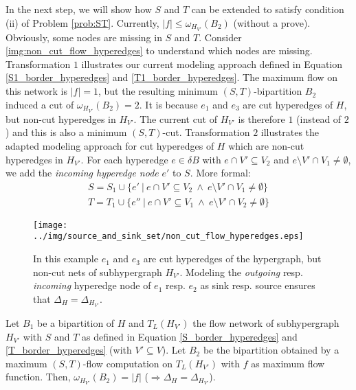 In the next step, we will show how $S$ and $T$ can be extended to satisfy condition (ii)
of Problem \autoref{prob:ST}. Currently, $|f| \le \omega_{H_{V'}}(B_2)$ (without a prove).
Obviously, some nodes are missing in $S$ and $T$. Consider \autoref{img:non_cut_flow_hyperedges}
to understand which nodes are missing. Transformation $1$ illustrates our current modeling
approach defined in Equation \ref{S1_border_hyperedges} and \ref{T1_border_hyperedges}. The maximum
flow on this network is $|f| = 1$, but the resulting minimum $(S,T)$-bipartition $B_2$ induced 
a cut of $\omega_{H_{V'}}(B_2) = 2$. It is because $e_1$ and $e_3$ are cut
hyperedges of $H$, but non-cut hyperedges in $H_{V'}$. The current cut of $H_{V'}$ is therefore
$1$ (instead of $2$) and this is also a minimum $(S,T)$-cut. Transformation $2$ illustrates the
adapted modeling approach for cut hyperedges of $H$ which are non-cut hyperedges in $H_{V'}$.
For each hyperedge $e \in \delta B$ with $e \cap V' \subseteq V_2$ and $e \setminus V' \cap V_1 \neq \emptyset$, 
we add the \emph{incoming hyperedge node} $e'$ to $S$.
More formal:
\begin{align}
S = S_1 \cup \{e'\ |\ e \cap V' \subseteq V_2 \ \land\ e \setminus V' \cap V_1  \neq \emptyset\} \label{S_border_hyperedges}\\
T = T_1 \cup \{e''\ |\ e \cap V' \subseteq V_1 \ \land\ e \setminus V' \cap V_2 \neq \emptyset \} \label{T_border_hyperedges}
\end{align}

\begin{figure}[ht!]
\centering
\texttt{[image: ../img/source\_and\_sink\_set/non\_cut\_flow\_hyperedges.eps]}
\caption{In this example $e_1$ and $e_3$ are cut hyperedges of the hypergraph, but non-cut nets
        of subhypergraph $H_{V'}$. Modeling the \emph{outgoing} resp.
        \emph{incoming} hyperedge node of $e_1$ resp. $e_2$ as sink resp. source ensures
        that $\Delta_H = \Delta_{H_{V'}}$.} 
\label{img:non_cut_flow_hyperedges}
\end{figure}

\begin{lemma}
\label{lemma:delta_proof}
Let $B_1$ be a bipartition of $H$ and $T_L(H_{V'})$ the flow network of subhypergraph
$H_{V'}$ with $S$ and $T$ as defined in Equation \ref{S_border_hyperedges} and \ref{T_border_hyperedges} (with $V' \subseteq V$).
Let $B_2$ be the bipartition obtained by a maximum $(S,T)$-flow computation on $T_L(H_{V'})$
with $f$ as maximum flow function.
Then, $\omega_{H_{V'}}(B_2) = |f|$ ($\Rightarrow \Delta_H = \Delta_{H_{V'}}$).
\end{lemma}
 
